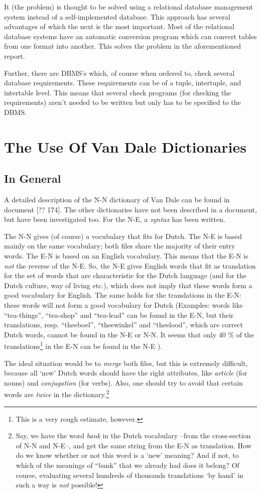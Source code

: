 It (the problem) is thought to be solved using a relational database management 
system instead of a self-implemented database. This approach has several 
advantages of which the next is the most important. Most of the relational 
database systems have an automatic conversion program which can convert tables 
from one format into another. This solves the problem in the aforementioned 
report. 

Further, there are DBMS's which, of course when ordered to, check several 
database requirements. These requirements can be of a tuple, intertuple, and 
intertable level. This means that several check programs (for checking the 
requirements) aren't needed to be written but only has to be specified to the 
DBMS. 

\newpage
\section{The Use Of Van Dale Dictionaries}

\subsection{In General}

A detailed description of the N-N dictionary of Van Dale can be found in 
document [?? 174]. The other dictionaries have not been described in a
document, but have been investigated too. For the N-E, a {\em syntax} has 
been written.

The N-N gives (of course) a vocubalary that fits for Dutch. The N-E is based 
mainly on the same vocabulary; both files share the majority of their entry 
words. The E-N is based on an English vocabulary. This means that the E-N is
{\em not} the reverse of the N-E. So, the N-E gives English words that fit as 
translation for the set of words that are characteristic for the Dutch language
(and for the Dutch culture, way of living etc.), which does not imply that 
these words form a good vocabulary for English. The same holds for the 
translations in the E-N: these words will not form a good vocabulary for Dutch
(Examples: words like ``tea-things'', ``tea-shop'' and ``tea-lead'' can be found
in the E-N, but their translations, resp. ``theeboel'', ``theewinkel'' and 
``theelood'', which are correct Dutch words, cannot be found in the N-E or 
N-N. It seems that only 40 \% of the translations\footnote{This 
is a very rough estimate, however.} in the E-N can be found 
in the N-E ).

The ideal situation would be to {\em merge} both files, but this is extremely 
difficult, because all `new' Dutch words should have the right attributes, 
like {\em article} (for nouns) and 
{\em conjugation} (for verbs). Also, one should try to avoid that 
certain words are {\em twice} in the dictionary.\footnote{Say, we have the word 
{\em bank} in the Dutch vocabulary --from the cross-section of N-N and N-E--, 
and get the same string from the E-N as translation. How do we know 
whether or not this word
is a `new' meaning? And if not, to which of the meanings of ``bank'' that we 
already had does it belong? 
Of course, evaluating several hundreds of thousands translations
`by hand' in such a way is {\em not} possible!}

